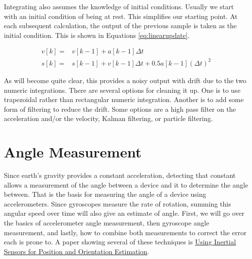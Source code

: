 Integrating also assumes the knowledge of initial conditions. Usually we start with an initial condition of 
being at rest. This simplifies our starting point. At each subsequent calculation, the output of the previous
sample is taken as the initial condition. This is shown in Equations \ref{eq:linearupdate}.

\begin{subequations}
	\label{eq:linearupdate}
	\begin{align}
		v[k] =& v[k-1] + a[k-1]\Delta t \\
		s[k] =& s[k-1] + v[k-1]\Delta t + 0.5a[k-1](\Delta t)^2
	\end{align}
\end{subequations}

As will become quite clear, this provides a noisy output with drift due to the two numeric integrations.
There are several options for cleaning it up. One is to use trapezoidal rather than rectangular
numeric integration. Another is to add some form of filtering to reduce the drift. Some options are
a high pass filter on the acceleration and/or the velocity, Kalman filtering, or particle filtering.


\section{Angle Measurement}
Since earth's gravity provides a constant acceleration, detecting that constant allows a measurement of the 
angle between a device and it to determine the angle between. That is the basis for measuring the angle 
of a device using accelerometers. Since gyroscopes measure the rate of rotation, summing this angular
speed over time will also give an estimate of angle. First, we will go over the basics of accelerometer 
angle measurement, then gyroscope angle measurement, and lastly, how to combine both measurements to correct
the error each is prone to. A paper showing several of these techniques is 
\href{https://arxiv.org/pdf/1704.06053.pdf}{Using Inertial Sensors for Position
and Orientation Estimation}.

